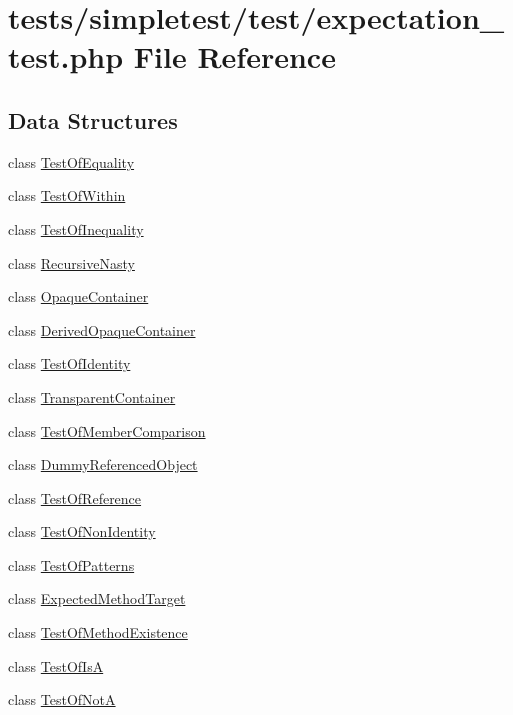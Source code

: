 \hypertarget{expectation__test_8php}{\section{tests/simpletest/test/expectation\-\_\-test.php File Reference}
\label{expectation__test_8php}
}
\subsection*{Data Structures}
\begin{DoxyCompactItemize}
\item 
class \hyperlink{class_test_of_equality}{Test\-Of\-Equality}
\item 
class \hyperlink{class_test_of_within}{Test\-Of\-Within}
\item 
class \hyperlink{class_test_of_inequality}{Test\-Of\-Inequality}
\item 
class \hyperlink{class_recursive_nasty}{Recursive\-Nasty}
\item 
class \hyperlink{class_opaque_container}{Opaque\-Container}
\item 
class \hyperlink{class_derived_opaque_container}{Derived\-Opaque\-Container}
\item 
class \hyperlink{class_test_of_identity}{Test\-Of\-Identity}
\item 
class \hyperlink{class_transparent_container}{Transparent\-Container}
\item 
class \hyperlink{class_test_of_member_comparison}{Test\-Of\-Member\-Comparison}
\item 
class \hyperlink{class_dummy_referenced_object}{Dummy\-Referenced\-Object}
\item 
class \hyperlink{class_test_of_reference}{Test\-Of\-Reference}
\item 
class \hyperlink{class_test_of_non_identity}{Test\-Of\-Non\-Identity}
\item 
class \hyperlink{class_test_of_patterns}{Test\-Of\-Patterns}
\item 
class \hyperlink{class_expected_method_target}{Expected\-Method\-Target}
\item 
class \hyperlink{class_test_of_method_existence}{Test\-Of\-Method\-Existence}
\item 
class \hyperlink{class_test_of_is_a}{Test\-Of\-Is\-A}
\item 
class \hyperlink{class_test_of_not_a}{Test\-Of\-Not\-A}
\end{DoxyCompactItemize}

